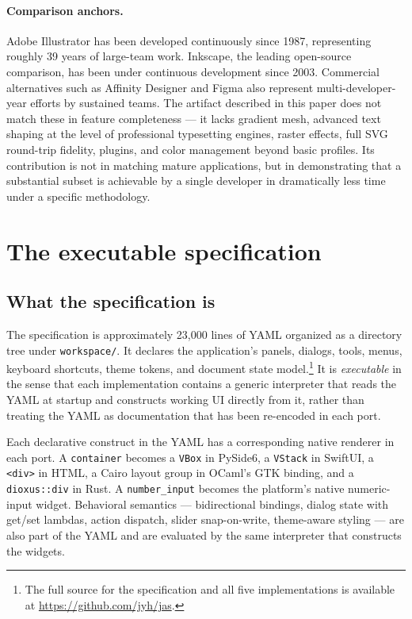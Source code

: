 \documentclass[10pt]{article}
\begin{document}
\paragraph{Comparison anchors.} Adobe Illustrator has been developed
continuously since 1987, representing roughly 39 years of large-team work.
Inkscape, the leading open-source comparison, has been under continuous
development since 2003. Commercial alternatives such as Affinity Designer
and Figma also represent multi-developer-year efforts by sustained teams.
The artifact described in this paper does not match these in feature
completeness --- it lacks gradient mesh, advanced text shaping at the level
of professional typesetting engines, raster effects, full SVG round-trip
fidelity, plugins, and color management beyond basic profiles. Its
contribution is not in matching mature applications, but in demonstrating
that a substantial subset is achievable by a single developer in
dramatically less time under a specific methodology.

\section{The executable specification}
\label{sec:spec}

\subsection{What the specification is}

The specification is approximately 23{,}000 lines of YAML organized as a
directory tree under \texttt{workspace/}. It declares the application's
panels, dialogs, tools, menus, keyboard shortcuts, theme tokens, and
document state model.\footnote{The full source for the specification and
all five implementations is available at \url{https://github.com/jyh/jas}.}
It is \emph{executable} in the sense that each implementation contains a
generic interpreter that reads the YAML at startup and constructs working
UI directly from it, rather than treating the YAML as documentation that
has been re-encoded in each port.

Each declarative construct in the YAML has a corresponding native renderer
in each port. A \texttt{container} becomes a \texttt{VBox} in PySide6, a
\texttt{VStack} in SwiftUI, a \texttt{<div>} in HTML, a Cairo layout group
in OCaml's GTK binding, and a \texttt{dioxus::div} in Rust. A
\texttt{number\_input} becomes the platform's native numeric-input widget.
Behavioral semantics --- bidirectional bindings, dialog state with get/set
lambdas, action dispatch, slider snap-on-write, theme-aware styling --- are
also part of the YAML and are evaluated by the same interpreter that
constructs the widgets.
\end{document}
